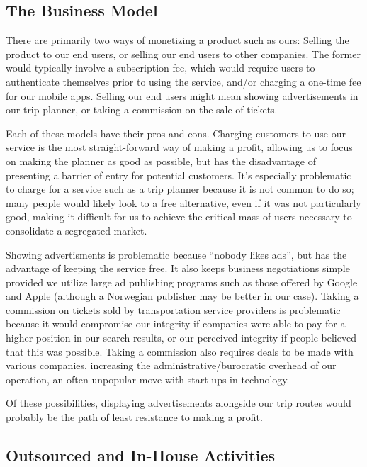 \subsection{The Business Model}

There are primarily two ways of monetizing a product such as ours: Selling the
product to our end users, or selling our end users to other companies. The
former would typically involve a subscription fee, which would require users
to authenticate themselves prior to using the service, and/or charging a
one-time fee for our mobile apps. Selling our end users might mean showing
advertisements in our trip planner, or taking a commission on the sale of
tickets.

Each of these models have their pros and cons. Charging customers to use our
service is the most straight-forward way of making a profit, allowing us to
focus on making the planner as good as possible, but has the disadvantage
of presenting a barrier of entry for potential customers. It's especially
problematic to charge for a service such as a trip planner because it is
not common to do so; many people would likely look to a free alternative,
even if it was not particularly good, making it difficult for us to achieve
the critical mass of users necessary to consolidate a segregated market.

Showing advertisments is problematic because ``nobody likes ads'', but has the
advantage of keeping the service free. It also keeps business negotiations
simple provided we utilize large ad publishing programs such as those offered
by Google and Apple (although a Norwegian publisher may be better in our
case). Taking a commission on tickets sold by transportation service providers
is problematic because it would compromise our integrity if companies were
able to pay for a higher position in our search results, or our perceived
integrity if people believed that this was possible. Taking a commission
also requires deals to be made with various companies, increasing the
administrative/burocratic overhead of our operation, an often-unpopular move
with start-ups in technology.

Of these possibilities, displaying advertisements alongside our trip routes
would probably be the path of least resistance to making a profit.

\subsection{Outsourced and In-House Activities}

